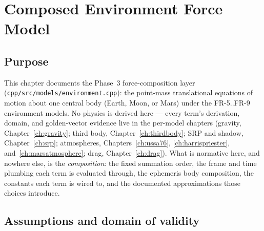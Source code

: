 \chapter{Composed Environment Force Model}
\label{ch:environment}

\section{Purpose}
\label{sec:env:purpose}

This chapter documents the Phase~3 force-composition layer
(\texttt{cpp/src/models/environment.cpp}): the point-mass translational
equations of motion about one central body (Earth, Moon, or Mars) under
the FR-5..FR-9 environment models. No physics is derived here --- every
term's derivation, domain, and golden-vector evidence live in the
per-model chapters (gravity, Chapter~\ref{ch:gravity}; third body,
Chapter~\ref{ch:thirdbody}; SRP and shadow, Chapter~\ref{ch:srp};
atmospheres, Chapters~\ref{ch:ussa76}, \ref{ch:harrispriester},
and~\ref{ch:marsatmosphere}; drag, Chapter~\ref{ch:drag}). What is
normative here, and nowhere else, is the \emph{composition}: the fixed
summation order, the frame and time plumbing each term is evaluated
through, the ephemeris body composition, the constants each term is wired
to, and the documented approximations those choices introduce.

\section{Assumptions and domain of validity}
\label{sec:env:domain}

